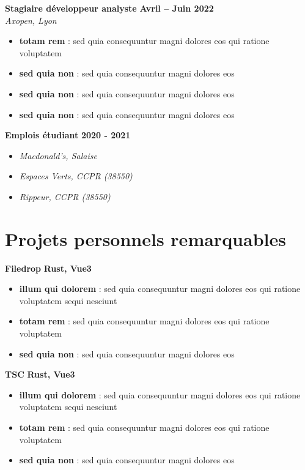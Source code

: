 \documentclass[a4paper,10pt]{article}
\begin{document}
\begin{paracol}{2}
\begin{flushleft}
  \textbf{Stagiaire développeur analyste} \hfill \textbf{Avril – Juin 2022} \\
  \textit{Axopen, Lyon} \\
  \begin{itemize}[left=0pt,label={--},nosep]
    \item \textbf{totam rem} : sed quia consequuntur magni dolores eos qui ratione voluptatem
    \item \textbf{sed quia non} : sed quia consequuntur magni dolores eos
    \item \textbf{sed quia non} : sed quia consequuntur magni dolores eos
    \item \textbf{sed quia non} : sed quia consequuntur magni dolores eos
  \end{itemize}
  \vspace{1em}
  
  \textbf{Emplois étudiant} \hfill \textbf{2020 - 2021} \\
  \begin{itemize}[left=0pt,label={--},nosep]
    \item \textit{Macdonald's, Salaise} \\
    \item \textit{Espaces Verts, CCPR (38550)} \\
    \item \textit{Rippeur, CCPR (38550)} \\
  \end{itemize}

  \section*{Projets personnels remarquables}

  \textbf{Filedrop} \hfill \textbf{Rust, Vue3} \\
  \begin{itemize}[left=0pt,label={--},nosep]
    \item \textbf{illum qui dolorem} : sed quia consequuntur magni dolores eos qui ratione voluptatem sequi nesciunt
    \item \textbf{totam rem} : sed quia consequuntur magni dolores eos qui ratione voluptatem
    \item \textbf{sed quia non} : sed quia consequuntur magni dolores eos
  \end{itemize}
  \vspace{1em}

  \textbf{TSC} \hfill \textbf{Rust, Vue3} \\
  \begin{itemize}[left=0pt,label={--},nosep]
    \item \textbf{illum qui dolorem} : sed quia consequuntur magni dolores eos qui ratione voluptatem sequi nesciunt
    \item \textbf{totam rem} : sed quia consequuntur magni dolores eos qui ratione voluptatem
    \item \textbf{sed quia non} : sed quia consequuntur magni dolores eos
  \end{itemize}
  \vspace{1em}


\end{flushleft}
\end{paracol}
\end{document}
